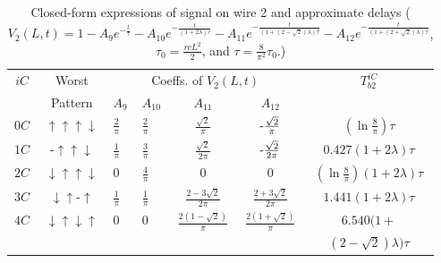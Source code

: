 \documentclass[10pt,journal]{IEEEtran}
\def\d{\downarrow}
\def\u{\uparrow}
\begin{document}
\begin{table}[!t]
\caption{Closed-form expressions of signal on wire 2 and approximate delays ($V_2(L,t) = 1-A_9 e^{-\frac{t}{\tau}} - A_{10}e^{-\frac{t}{(1+2\lambda)\tau}} - A_{11} e^{-\frac{t}{(1+(2-\sqrt{2})\lambda)\tau}} - A_{12} e^{-\frac{t}{(1+(2+\sqrt{2})\lambda)\tau}}$, $\tau_0=\frac{rcL^2}{2}$, and $\tau=\frac{8}{\pi^2}\tau_0$.)}\label{tab:wire2}
\begin{center}
\begin{tabular}{|c|c|p{3mm}|p{3mm}|c|c|c|}
\hline
\multirow{2}{*}{$iC$} & Worst & \multicolumn{4}{|c|}{Coeffs. of $V_2(L,t)$} & \multirow{2}{*}{$T_{b2}^{iC}$}\\
\cline{3-6}
& Pattern & $A_9$ & $A_{10}$ & $A_{11}$ & $A_{12}$ & \\
\hline
$0C$ & $\u\u\u\d$ & $\frac{2}{\pi}$ & $\frac{2}{\pi}$ & $\frac{\sqrt{2}}{\pi}$ & $\textnormal{-}\frac{\sqrt{2}}{\pi}$ & $(\ln \frac{8}{\pi})\tau$ \\
\hline
$1C$ & -$\u\u\d$ & $\frac{1}{\pi}$ & $\frac{3}{\pi}$ & $\frac{\sqrt{2}}{2\pi}$ & $\textnormal{-}\frac{\sqrt{2}}{2\pi}$ & $0.427(1+2\lambda)\tau$\\
\hline
$2C$ & $\d\u\u\d$ & 0 & $\frac{4}{\pi}$ & 0 & 0 & $(\ln \frac{8}{\pi})(1+2\lambda)\tau$ \\
\hline
$3C$ & $\d\u$-$\u$ & $\frac{1}{\pi}$ & $\frac{1}{\pi}$ & $\frac{2-3\sqrt{2}}{2\pi}$ & $\frac{2+3\sqrt{2}}{2\pi}$ & $1.441(1+2\lambda)\tau$\\
\hline
\multirow{2}{*}{$4C$} & \multirow{2}{*}{$\d\u\d\u$} & \multirow{2}{*}{0} & \multirow{2}{*}{0} & \multirow{2}{*}{$\frac{2(1-\sqrt{2})}{\pi}$} & \multirow{2}{*}{$\frac{2(1+\sqrt{2})}{\pi}$} & $6.540(1+$ \\
& & & & & & $(2-\sqrt{2})\lambda)\tau$\\
\hline
\end{tabular}
\end{center}
\end{table}
\end{document}

